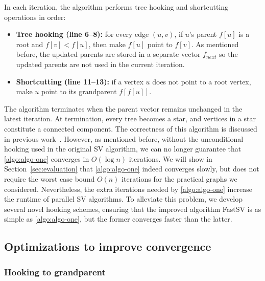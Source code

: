 \documentclass{sokendai_thesis} %
\begin{document}
In each iteration, the algorithm performs tree hooking and shortcutting operations in order:
\begin{itemize}
\item \textbf{Tree hooking (line 6--8):} for every edge $(u,v)$, if $u$'s parent $f[u]$ is a root and $f[v]<f[u]$, then make $f[u]$ point to $f[v]$. As mentioned before, the updated parents are stored in a separate vector $f_{\mathit{next}}$ so the updated parents are not used in the current iteration. 
\item \textbf{Shortcutting (line 11--13):} if a vertex $u$ does not point to a root vertex, make $u$ point to its grandparent $f[f[u]]$.
\end{itemize}

The algorithm terminates when the parent vector remains unchanged in the latest iteration.
At termination, every tree becomes a star, and vertices in a star constitute a connected component. 
The correctness of this algorithm is discussed in previous work~\cite{greiner1994comparison}.
However, as mentioned before, without the unconditional hooking used in the original SV algorithm, we can no longer guarantee that \autoref{algo:algo-one} converges in $O(\log n)$ iterations. 
We will show in Section~\ref{sec:evaluation} that \autoref{algo:algo-one} indeed converges slowly, but does not require the worst case bound $O(n)$ iterations for the practical graphs we considered. 
Nevertheless, the extra iterations needed by \autoref{algo:algo-one} increase the runtime of parallel SV algorithms. 
To alleviate this problem, we develop several novel hooking schemes, ensuring that the improved algorithm FastSV  is as simple as \autoref{algo:algo-one}, but the former converges faster than the latter.

\subsection{Optimizations to improve convergence}

\subsubsection{Hooking to grandparent}
\end{document}
